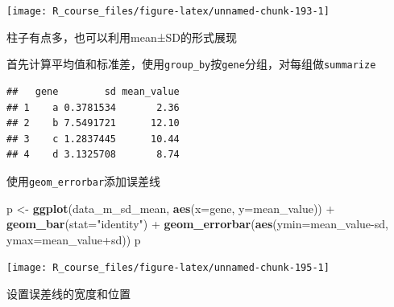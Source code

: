 \documentclass[]{article}
\newenvironment{Shaded}{\begin{snugshade}}{\end{snugshade}}
\newcommand{\KeywordTok}[1]{\textcolor[rgb]{0.13,0.29,0.53}{\textbf{{#1}}}}
\newcommand{\DataTypeTok}[1]{\textcolor[rgb]{0.13,0.29,0.53}{{#1}}}
\newcommand{\StringTok}[1]{\textcolor[rgb]{0.31,0.60,0.02}{{#1}}}
\newcommand{\CommentTok}[1]{\textcolor[rgb]{0.56,0.35,0.01}{\textit{{#1}}}}
\newcommand{\NormalTok}[1]{{#1}}
\numberwithin{figure}{section}
\numberwithin{table}{section}
\theoremstyle{definition}
\theoremstyle{definition}
\theoremstyle{definition}
\theoremstyle{remark}
\begin{document}
\begin{center}\texttt{[image: R\_course\_files/figure-latex/unnamed-chunk-193-1]} \end{center}

柱子有点多，也可以利用mean±SD的形式展现

首先计算平均值和标准差，使用\texttt{group\_by}按\texttt{gene}分组，对每组做\texttt{summarize}

\begin{Shaded}
\end{Shaded}

\begin{verbatim}
##   gene        sd mean_value
## 1    a 0.3781534       2.36
## 2    b 7.5491721      12.10
## 3    c 1.2837445      10.44
## 4    d 3.1325708       8.74
\end{verbatim}

使用\texttt{geom\_errorbar}添加误差线

\begin{Shaded}
\begin{Highlighting}[]
\NormalTok{p <-}\StringTok{ }\KeywordTok{ggplot}\NormalTok{(data_m_sd_mean, }\KeywordTok{aes}\NormalTok{(}\DataTypeTok{x=}\NormalTok{gene, }\DataTypeTok{y=}\NormalTok{mean_value)) +}\StringTok{ }
\StringTok{       }\KeywordTok{geom_bar}\NormalTok{(}\DataTypeTok{stat=}\StringTok{"identity"}\NormalTok{) +}
\StringTok{     }\KeywordTok{geom_errorbar}\NormalTok{(}\KeywordTok{aes}\NormalTok{(}\DataTypeTok{ymin=}\NormalTok{mean_value-sd, }\DataTypeTok{ymax=}\NormalTok{mean_value+sd))}
\NormalTok{p}
\end{Highlighting}
\end{Shaded}

\begin{center}\texttt{[image: R\_course\_files/figure-latex/unnamed-chunk-195-1]} \end{center}

设置误差线的宽度和位置
\end{document}

